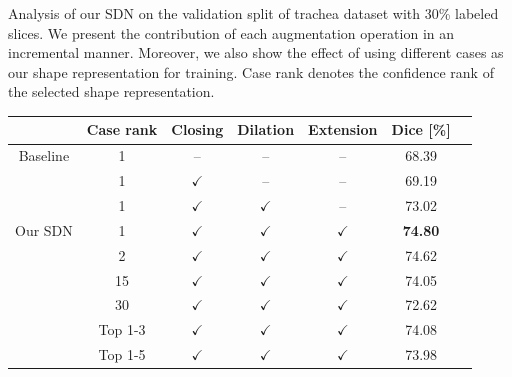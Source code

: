     \begin{table}[t!]
        \centering
        {Analysis of our SDN on the validation split of trachea dataset with 30\% labeled slices. We present the contribution of each augmentation operation in an incremental manner. Moreover, we also show the effect of using different cases as our shape representation for training. Case rank denotes the confidence rank of the selected shape representation.}
        \label{tab:ablation_aug}        
            \begin{tabular}{c c c c c c c}
                \toprule
                & Case rank & Closing     & Dilation     & Extension      & Dice [\%]  \\ \midrule
                Baseline & 1 & --              & --                & --                & 68.39        \\
                & 1 & $\checkmark$    & --                & --                & 69.19         \\ %
                & 1 & $\checkmark$    & $\checkmark$      & --                & 73.02        \\ %
                Our SDN  & 1 & $\checkmark$    & $\checkmark$      & $\checkmark$      & \textbf{74.80}             \\ \midrule
                & 2 & $\checkmark$    & $\checkmark$      & $\checkmark$      & 74.62             \\ 
                & 15 & $\checkmark$    & $\checkmark$      & $\checkmark$      & 74.05             \\ 
                & 30 & $\checkmark$    & $\checkmark$      & $\checkmark$      & 72.62             \\ 
                \midrule
                & Top 1-3 & $\checkmark$    & $\checkmark$      & $\checkmark$      & 74.08             \\
                & Top 1-5 & $\checkmark$    & $\checkmark$      & $\checkmark$      & 73.98             \\
                \bottomrule
            \end{tabular}
    \end{table}

